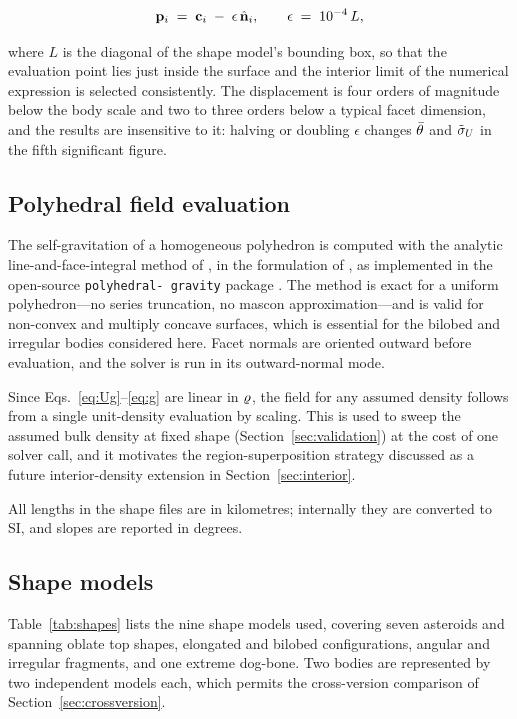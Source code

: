 \begin{equation}
\mathbf{p}_{i} \;=\; \mathbf{c}_{i} \;-\; \epsilon\,\hat{\mathbf{n}}_{i},
\qquad
\epsilon \;=\; 10^{-4}\,L,
\label{eq:eps}
\end{equation}

where $L$ is the diagonal of the shape model's bounding box, so that the
evaluation point lies just inside the surface and the interior limit of the
numerical expression is selected consistently. The displacement is four orders
of magnitude below the body scale and two to three orders below a typical facet
dimension, and the results are insensitive to it: halving or doubling
$\epsilon$ changes $\bar{\theta}$ and $\tilde{\sigma}_{U}$ in the fifth significant figure.

\subsection{Polyhedral field evaluation}
\label{sec:solver}

The self-gravitation of a homogeneous polyhedron is computed with the analytic
line-and-face-integral method of \citet{werner1996}, in the formulation of
\citet{tsoulis2012}, as implemented in the open-source \texttt{polyhedral-%
gravity} package \citep{gravitylib}. The method is exact for a uniform
polyhedron---no series truncation, no mascon approximation---and is valid for
non-convex and multiply concave surfaces, which is essential for the bilobed and
irregular bodies considered here. Facet normals are oriented outward before
evaluation, and the solver is run in its outward-normal mode.

Since Eqs.~\eqref{eq:Ug}--\eqref{eq:g} are linear in $\varrho$, the field for any
assumed density follows from a single unit-density evaluation by scaling. This
is used to sweep the assumed bulk density at fixed shape
(Section~\ref{sec:validation}) at the cost of one solver call, and it motivates the
region-superposition strategy discussed as a future interior-density extension
in Section~\ref{sec:interior}.

All lengths in the shape files are in kilometres; internally they are converted
to SI, and slopes are reported in degrees.

\subsection{Shape models}
\label{sec:shapes}

Table~\ref{tab:shapes} lists the nine shape models used, covering seven
asteroids and spanning oblate top shapes, elongated and bilobed configurations,
angular and irregular fragments, and one extreme dog-bone. Two bodies are
represented by two independent models each, which permits the cross-version
comparison of Section~\ref{sec:crossversion}.

